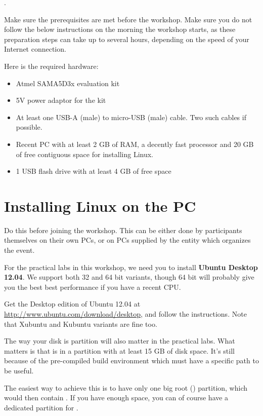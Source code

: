 .

Make sure the prerequisites are met before the workshop. Make sure you
do not follow the below instructions on the morning the workshop starts,
as these preparation steps can take up to several hours, depending
on the speed of your Internet connection.

Here is the required hardware:
\begin{itemize}
\item Atmel SAMA5D3x evaluation kit
\item 5V power adaptor for the kit
\item At least one USB-A (male) to micro-USB (male) cable. Two such
      cables if possible.
\item Recent PC with at least 2 GB of RAM, a decently fast processor
      and 20 GB of free contiguous space for installing Linux.
\item 1 USB flash drive with at least 4 GB of free space
\end{itemize}

\section{Installing Linux on the PC}

Do this before joining the workshop. This can be either done by
participants themselves on their own PCs, or on PCs supplied by the
entity which organizes the event.
 
For the practical labs in this workshop, we need you to install
{\bf Ubuntu Desktop 12.04}. We support both 32 and 64 bit variants,
though 64 bit will probably give you the best best performance
if you have a recent CPU. 

Get the Desktop edition of Ubuntu 12.04 at 
\url{http://www.ubuntu.com/download/desktop}, and follow the
instructions. Note that Xubuntu and Kubuntu variants are fine too.

The way your disk is partition will also matter in the practical labs.
What matters is that  is in a partition with at least 15 GB
of disk space. It's still because of the pre-compiled build environment
which must have a specific path to be useful.

The easiest way to achieve this is to have only one big root (\code{/})
partition, which would then contain . If you have enough
space, you can of course have a dedicated partition for .

